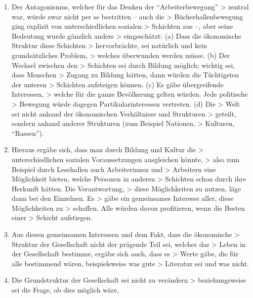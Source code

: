 \documentclass[a4paper,
fontsize=11pt,
oneside,
numbers=noperiodatend,
parskip=half-,
bibliography=totoc,
final
]{scrartcl}
\begin{document}
\begin{enumerate}
\def\labelenumi{(\arabic{enumi})}
\item
  Der Antagonismus, welcher für das Denken der
  \enquote{Arbeiterbewegung} \textgreater{} zentral war, würde zwar
  nicht per se bestritten -- auch die \textgreater{}
  Bücherhallenbewegung ging explizit von unterschiedlichen sozialen
  \textgreater{} Schichten aus --, aber seine Bedeutung wurde gänzlich
  anders \textgreater{} eingeschätzt: (a) Dass die ökonomische Struktur
  diese Schichten \textgreater{} hervorbrächte, sei natürlich und kein
  grundsätzliches Problem, \textgreater{} welches überwunden werden
  müsse. (b) Der Wechsel zwischen den \textgreater{} Schichten sei durch
  Bildung möglich; wichtig sei, dass Menschen \textgreater{} Zugang zu
  Bildung hätten, dann würden die Tüchtigsten der unteren \textgreater{}
  Schichten aufsteigen können. (c) Es gäbe übergreifende Interessen,
  \textgreater{} welche für die ganze Bevölkerung gelten würden. Jede
  politische \textgreater{} Bewegung würde dagegen Partikularinteressen
  vertreten. (d) Die \textgreater{} Welt sei nicht anhand der
  ökonomischen Verhältnisse und Strukturen \textgreater{} geteilt,
  sondern anhand anderer Strukturen (zum Beispiel Nationen,
  \textgreater{} Kulturen, \enquote{Rassen}).
\item
  Hieraus ergäbe sich, dass man durch Bildung und Kultur die
  \textgreater{} unterschiedlichen sozialen Voraussetzungen ausgleichen
  könnte, \textgreater{} also zum Beispiel durch Lesehallen auch
  Arbeiterinnen und \textgreater{} Arbeitern eine Möglichkeit bieten,
  welche Personen in anderen \textgreater{} Schichten schon durch ihre
  Herkunft hätten. Die Verantwortung, \textgreater{} diese Möglichkeiten
  zu nutzen, läge dann bei den Einzelnen. Es \textgreater{} gäbe ein
  gemeinsames Interesse aller, diese Möglichkeiten zu \textgreater{}
  schaffen. Alle würden davon profitieren, wenn die Besten einer
  \textgreater{} Schicht aufstiegen.
\item
  Aus diesen gemeinsamen Interessen und dem Fakt, dass die ökonomische
  \textgreater{} Struktur der Gesellschaft nicht der prägende Teil sei,
  welcher das \textgreater{} Leben in der Gesellschaft bestimme, ergäbe
  sich auch, dass es \textgreater{} Werte gäbe, die für alle bestimmend
  wären, beispielsweise was gute \textgreater{} Literatur sei und was
  nicht.
\item
  Die Grundstruktur der Gesellschaft sei nicht zu verändern
  \textgreater{} beziehungsweise sei die Frage, ob dies möglich wäre,

\end{enumerate}
\end{document}
